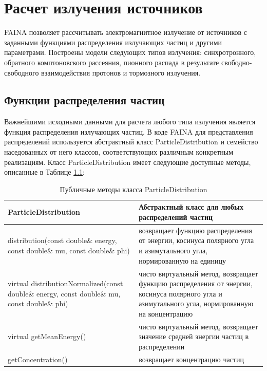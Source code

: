 \chapter{Расчет излучения источников}\label{radiation}
FAINA позволяет рассчитывать электромагнитное излучение от источников с заданными функциями распределения излучающих частиц и другими параметрами. Построены модели следующих типов излучения: синхротронного, обратного комптоновского рассеяния, пионного распада в результате свободно-свободного взаимодействия протонов и тормозного излучения.

\section{Функции распределения частиц}

Важнейшими исходными данными для расчета любого типа излучения является функция распределения излучающих частиц. В коде FAINA для представления распределений используется абстрактный класс ParticleDistribution и семейство наседованных от него классов, соответствующих различным конкретным реализациям. Класс ParticleDistribution имеет следующие доступные методы, описанные в Таблице \ref{ParticleDistribution}:

	\begin{table}
	\begin{center}
		\caption{Публичные методы класса ParticleDistribution }
		\label{ParticleDistribution}
		\begin{small}
		\begin{tabularx}{\textwidth}{|X|X|}
			\hline
			\textbf{ParticleDistribution} & Абстрактный класс для любых распределений частиц\\
			\hline
			distribution(const double\& energy, const double\& mu, const double\& phi) & возвращает функцию распределения от энергии, косинуса полярного угла и азимутального угла, нормированную на единицу \\
			\hline
			virtual distributionNormalized(const double\& energy, const double\& mu, const double\& phi) & чисто виртуальный метод, возвращает функцию распределения от энергии, косинуса полярного угла и азимутального угла, нормированную на концентрацию \\
			\hline
			virtual getMeanEnergy() & чисто виртуальный метод, возвращает значение средней энергии частиц в распределении\\
			\hline
			getConcentration() & возвращает концентрацию частиц\\
			\hline
		\end{tabularx}
	    \end{small}
	\end{center}
\end{table}

